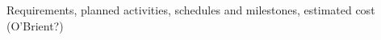 \documentclass[PICOReport.tex]{subfiles}
\begin{document}
Requirements, planned activities, schedules and milestones, estimated cost (O'Brient?)
\end{document}
